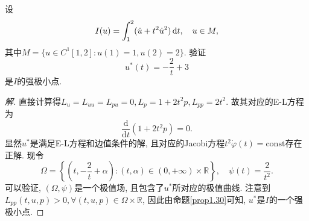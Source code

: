\begin{example}
    设 
    \begin{equation*}
        I(u) = \int_1^2(\dot u + t^2\dot u^2) \,{\rm d}t, \quad u \in M, 
    \end{equation*}
    其中$M = \{u \in C^1[1, 2]\colon u(1) = 1, u(2) = 2\}$. 验证 
    \begin{equation*}
        u^*(t) = -\frac{2}{t} + 3
    \end{equation*}
    是$I$的强极小点.
    \begin{proof}[解]
        直接计算得$L_u = L_{uu} = L_{pu} = 0, L_p = 1 + 2t^2p, L_{pp} = 2t^2$. 故其对应的E-L方程为
        \begin{equation*}
            \frac{\mathrm{d}}{\mathrm{d}t}(1 + 2t^2p) = 0.
        \end{equation*}
        显然$u^*$是满足E-L方程和边值条件的解, 且对应的Jacobi方程$t^2\dot\varphi(t) = \mathrm{const}$存在正解.
        现令 
        \begin{equation*}
            \Omega = \left\{\left(t, -\frac{2}{t} + \alpha\right)\colon (t, \alpha) \in (0, +\infty) \times \mathbb{R}\right\}, \quad \psi(t) = \frac{2}{t^2}. 
        \end{equation*}
        可以验证, $(\Omega, \psi)$是一个极值场, 且包含了$u^*$所对应的极值曲线. 注意到$L_{pp}(t, u, p) > 0, \forall(t, u, p) \in \Omega \times \mathbb{R}$, 因此由命题\ref{prop1.30}可知, $u^*$是$I$的一个强极小点.
    \end{proof}
\end{example}
